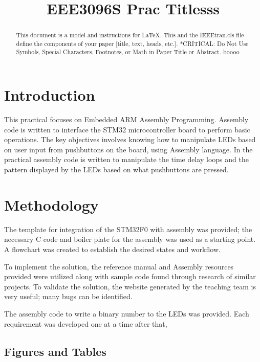 \documentclass[conference]{IEEEtran}
\begin{document}
\title{EEE3096S Prac Titlesss}

\author{
\and
{}
}

\maketitle

\begin{abstract}
This document is a model and instructions for \LaTeX.
This and the IEEEtran.cls file define the components of your paper [title, text, heads, etc.]. *CRITICAL: Do Not Use Symbols, Special Characters, Footnotes, 
or Math in Paper Title or Abstract. boooo
\end{abstract}


\section{Introduction}
This practical focuses on Embedded ARM Assembly Programming. Assembly code is written to interface the STM32 microcontroller board to perform basic operations. The key objectives involves knowing how to manipulate LEDs based on user input from pushbuttons on the board, using Assembly language. In the practical assembly code is written to manipulate the time delay loops and the pattern displayed by the LEDs based on what pushbuttons are pressed.


\section{Methodology}

The template for integration of the STM32F0 with assembly was provided; the necessary C code and boiler plate for the assembly was used as a starting point. A flowchart was created to establish the desired states and workflow.

To implement the solution, the reference manual and Assembly resources provided were utilized along with sample code found through research of similar projects. To validate the solution, the website generated by the teaching team is very useful; many bugs can be identified.

The assembly code to write a binary number to the LEDs was provided. Each requirement was developed one at a time after that, 

\subsection{Figures and Tables}
\end{document}
